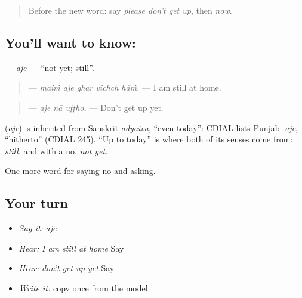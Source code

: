 \label{lesson:PA-C213-aje}



\begin{quote}
Before the new word: say \emph{please don't get up}, then \emph{now}.
\end{quote}

\subsection*{You'll want to know: }
\textbf{} — \emph{aje} — \textquotedblleft{}not yet; still\textquotedblright{}.

\begin{quote}
\textbf{    } — \emph{maiṁ aje ghar vichch hāṁ.} — I am still at home.
\end{quote}

\begin{quote}
\textbf{  } — \emph{aje nā uṭṭho.} — Don't get up yet.
\end{quote}

\begin{cousinweb}
\textbf{} (\emph{aje}) is inherited from Sanskrit \emph{adyaiva}, \textquotedblleft{}even today\textquotedblright{}: CDIAL lists Punjabi \emph{aje}, \textquotedblleft{}hitherto\textquotedblright{} (CDIAL 245). \textquotedblleft{}Up to today\textquotedblright{} is where both of its senses come from: \emph{still}, and with a no, \emph{not yet}.
\end{cousinweb}

\begin{grammarlens}[title={What you've built}]
One more word for saying no and asking.
\end{grammarlens}

\subsection*{Your turn}
\begin{itemize}
\raggedright
  \item \emph{Say it:} \emph{aje}
  \item \emph{Hear:} \emph{I am still at home} Say \textbf{    }
  \item \emph{Hear:} \emph{don't get up yet} Say \textbf{  }
  \item \emph{Write it:} copy \textbf{} once from the model
\end{itemize}

